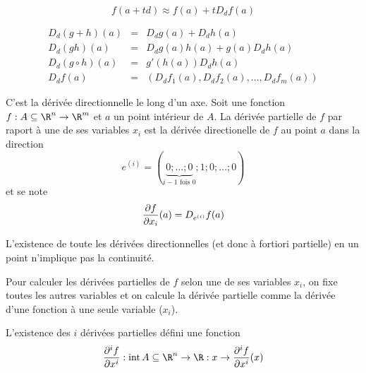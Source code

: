 \begin{myform}
	\[ f(a+td) \approx f(a) + t D_df(a) \]
\end{myform}

\begin{myform}
	\begin{eqnarray*}
		D_d(g+h)(a) &=& D_dg(a) + D_d h(a)\\
		D_d(gh)(a) &=& D_dg(a)h(a) + g(a)D_dh(a)\\
		D_d(g\circ h)(a) &=& g'(h(a))D_dh(a)\\
		D_df(a) &=& (D_df_1(a), D_df_2(a), \dots, D_df_m(a))
	\end{eqnarray*}
\end{myform}

\begin{mydef}
	C'est la dérivée directionnelle le long d'un axe.
	Soit une fonction $f : A\subseteq \R^n \to \R^m$ et $a$ un point intérieur de $A$. La dérivée partielle de $f$ par raport à une de ses variables $x_i$ est la dérivée directionelle de $f$ au point $a$ dans la direction
	\[ e^{(i)} = (\underbrace{0; \dots; 0}_{i-1\text{ fois }0}; 1; 0; \dots; 0) \]
	et se note
	\[ \frac{\partial f}{\partial x_i}(a) = D_{e^{(i)}} f(a) \]
\end{mydef}

\begin{myrem}
	L'existence de toute les dérivées directionnelles (et donc à fortiori partielle) en un point n'implique pas la continuité.
\end{myrem}

\begin{myform} Pour calculer les dérivées partielles de $f$ selon une de ses variables $x_i$, on fixe toutes les autres variables et on calcule la dérivée partielle comme la dérivée d'une fonction à une seule variable ($x_i$).
\end{myform}

\begin{mydef}
	L'existence des $i$\ieme{} dérivées partielles défini une fonction
	\[ \frac{\pa^i f}{\pa x^i} : \newint A \subseteq \R^n \to \R : x \to \frac{\pa^i f}{\pa x^i}(x) \]
\end{mydef}


